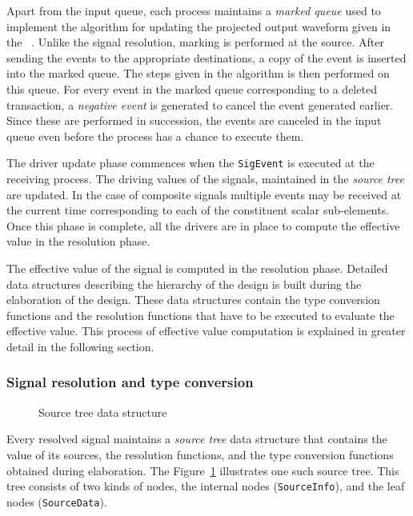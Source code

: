 \documentclass[11pt]{article}
\begin{document}
Apart from the input queue, each process maintains a \textit{marked
queue} used to implement the algorithm for updating the projected
output waveform given in the \LRM~.  Unlike the signal
resolution, marking is performed at the source.  After sending the
events to the appropriate destinations, a copy of the event is
inserted into the marked queue.  The steps given in the algorithm is
then performed on this queue.  For every event in the marked queue
corresponding to a deleted transaction, a \textit{negative event} is
generated to cancel the event generated earlier.  Since these are
performed in succession, the events are canceled in the input queue
even before the process has a chance to execute them.

The driver update phase commences when the \texttt{SigEvent} is
executed at the receiving process.  The driving values of the signals,
maintained in the \textit{source tree} are updated.  In the case of
composite signals multiple events may be received at the current time
corresponding to each of the constituent scalar sub-elements.  Once
this phase is complete, all the drivers are in place to compute the
effective value in the resolution phase.

The effective value of the signal is computed in the resolution phase.
Detailed data structures describing the hierarchy of the design is
built during the elaboration of the design.  These data structures
contain the type conversion functions and the resolution functions
that have to be executed to evaluate the effective value.  This
process of effective value computation is explained in greater detail
in the following section.

\subsubsection{Signal resolution and type conversion}

\begin{figure}[htbp]
  \centerline{}
  \caption{Source tree data structure}
  \label{fig:source_tree}
\end{figure}

Every resolved signal maintains a \textit{source tree} data structure
that contains the value of its sources, the resolution functions, and
the type conversion functions obtained during elaboration.  The
Figure~\ref{fig:source_tree} illustrates one such source tree.  This
tree consists of two kinds of nodes, the internal nodes
(\texttt{SourceInfo}), and the leaf nodes (\texttt{SourceData}).
\end{document}
